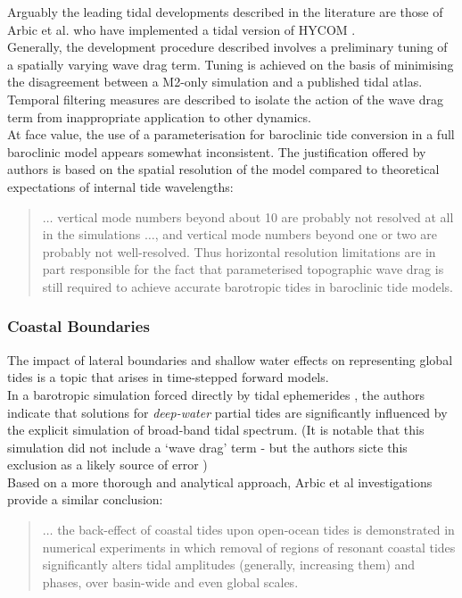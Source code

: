 Arguably the leading tidal \OGCM{} developments described in the literature are those of Arbic et al. who have implemented a tidal version of HYCOM \cite{Arbic:2005gv,Arbic:2009hf,Arbic:2010us,Arbic:hy}.\\
Generally, the development procedure described involves a preliminary tuning of a spatially varying wave drag term.  Tuning is achieved on the basis of minimising the disagreement between a M2-only simulation and a published tidal atlas.   
Temporal filtering measures are described to isolate the action of the wave drag term from inappropriate application to other dynamics.  \\
At face value, the use of a parameterisation for baroclinic tide conversion in a full baroclinic model appears somewhat inconsistent.   The justification offered by authors is based on the spatial resolution of the model compared to theoretical expectations of internal tide wavelengths:
\noindent \begin{quotation}
$\dots{}$  vertical mode numbers beyond about 10 are probably not resolved at all in the simulations $\dots{}$, and vertical mode numbers beyond one or two are probably not well-resolved. Thus horizontal resolution limitations are in part responsible for the fact that parameterised topographic wave drag is still required to achieve accurate barotropic tides in baroclinic tide models. \citep[pp177]{Arbic:2010us}
\end{quotation}



\subsubsection{Coastal Boundaries}

The impact of lateral boundaries and shallow water effects on representing global tides is a topic that arises in time-stepped forward models.\\
In a barotropic simulation forced directly by tidal ephemerides \cite{Weis:2008ex}, the authors indicate that solutions for \emph{deep-water} partial tides are significantly influenced by the explicit simulation of broad-band tidal spectrum.   
(It is notable that this simulation did not include a `wave drag' term - but the authors sicte this exclusion as a likely source of error \citep[pp5]{Weis:2008ex})\\
Based on a more thorough and analytical approach, Arbic et al investigations provide a similar conclusion:
\noindent \begin{quotation}
$\dots{}$ the back-effect of coastal tides upon open-ocean tides is demonstrated in numerical experiments in which removal of regions of resonant coastal tides significantly alters tidal amplitudes (generally, increasing them) and phases, over basin-wide and even global scales.\citep[pp263]{Arbic:2009in}
\end{quotation}


